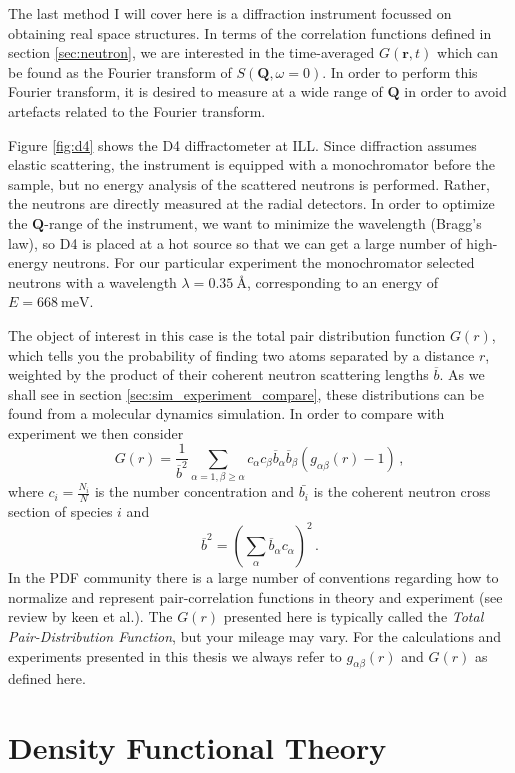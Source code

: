 The last method I will cover here is a diffraction instrument focussed on obtaining real space structures. In terms of the correlation functions defined in section \ref{sec:neutron}, we are interested in the time-averaged $G(\bm{r}, t)$ which can be found as the Fourier transform of $S(\bm{Q},\omega=0)$. In order to perform this Fourier transform, it is desired to measure at a wide range of $\bm{Q}$ in order to avoid artefacts related to the Fourier transform.

Figure \ref{fig:d4} shows the D4 diffractometer at ILL. Since diffraction assumes elastic scattering, the instrument is equipped with a monochromator before the sample, but no energy analysis of the scattered neutrons is performed. Rather, the neutrons are directly measured at the radial detectors. In order to optimize the $\bm{Q}$-range of the instrument, we want to minimize the wavelength (Bragg's law), so D4 is placed at a hot source so that we can get a large number of high-energy neutrons. For our particular experiment the monochromator selected neutrons with a wavelength $\lambda = \SI{0.35}{\angstrom}$, corresponding to an energy of $E = \SI{668}{\milli\eV}$.

The object of interest in this case is the total pair distribution function $G(r)$, which tells you the probability of finding two atoms separated by a distance $r$, weighted by the product of their coherent neutron scattering lengths $\overline{b}$. As we shall see in section \ref{sec:sim_experiment_compare}, these distributions can be found from a molecular dynamics simulation. In order to compare with experiment  we then consider
%
\[ G(r) = \frac{1}{\overline{b}^2} \sum_{\alpha=1,\beta\geq\alpha} c_\alpha c_\beta \overline{b}_\alpha \overline{b}_\beta (g_{\alpha\beta}(r) - 1) \, , \]
%
where $c_i = \frac{N_i}{N}$ is the number concentration and $\bar{b_i}$ is the coherent neutron cross section of species $i$ and 
%
\[ \overline{b}^2 = \left(\sum_\alpha \overline{b}_\alpha c_\alpha \right)^2 \, . \]
%
In the PDF community there is a large number of conventions regarding how to normalize and represent pair-correlation functions in theory and experiment (see review by keen et al.). The $G(r)$ presented here is typically called the \emph{Total Pair-Distribution Function}, but your mileage may vary. For the calculations and experiments presented in this thesis we always refer to $g_{\alpha\beta}(r)$ and $G(r)$ as defined here.

\section{Density Functional Theory}\label{sec:dft}

